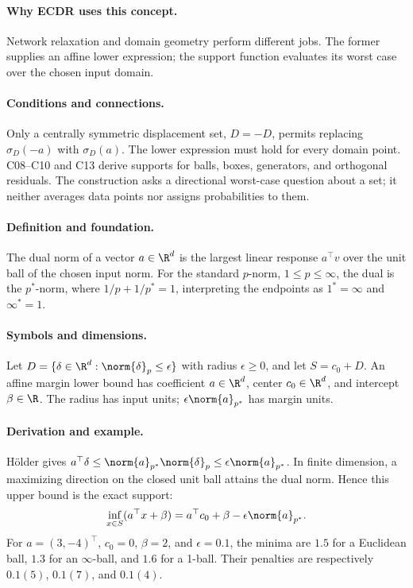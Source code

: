 \paragraph{Why ECDR uses this concept.}
Network relaxation and domain geometry perform different jobs. The former supplies an affine lower expression; the support function evaluates its worst case over the chosen input domain.
\paragraph{Conditions and connections.}
Only a centrally symmetric displacement set, $D=-D$, permits replacing $\sigma_D(-a)$ with $\sigma_D(a)$. The lower expression must hold for every domain point. C08--C10 and C13 derive supports for balls, boxes, generators, and orthogonal residuals. The construction asks a directional worst-case question about a set; it neither averages data points nor assigns probabilities to them.

\paragraph{Definition and foundation.}
The dual norm of a vector $a\in\R^d$ is the largest linear response $a^\top v$ over the unit ball of the chosen input norm. For the standard $p$-norm, $1\le p\le\infty$, the dual is the $p^*$-norm, where $1/p+1/p^*=1$, interpreting the endpoints as $1^*=\infty$ and $\infty^*=1$.
\paragraph{Symbols and dimensions.}
Let $D=\{\delta\in\R^d:\norm{\delta}_p\le\epsilon\}$ with radius $\epsilon\ge0$, and let $S=c_0+D$. An affine margin lower bound has coefficient $a\in\R^d$, center $c_0\in\R^d$, and intercept $\beta\in\R$. The radius has input units; $\epsilon\norm{a}_{p^*}$ has margin units.
\paragraph{Derivation and example.}
Hölder gives $a^\top\delta\le\norm{a}_{p^*}\norm{\delta}_p\le\epsilon\norm{a}_{p^*}$. In finite dimension, a maximizing direction on the closed unit ball attains the dual norm. Hence this upper bound is the exact support:
\[
 \inf_{x\in S}(a^\top x+\beta)
 =a^\top c_0+\beta-\epsilon\norm{a}_{p^*}.
\]
For $a=(3,-4)^\top$, $c_0=0$, $\beta=2$, and $\epsilon=0.1$, the minima are $1.5$ for a Euclidean ball, $1.3$ for an $\infty$-ball, and $1.6$ for a 1-ball. Their penalties are respectively $0.1(5)$, $0.1(7)$, and $0.1(4)$.
